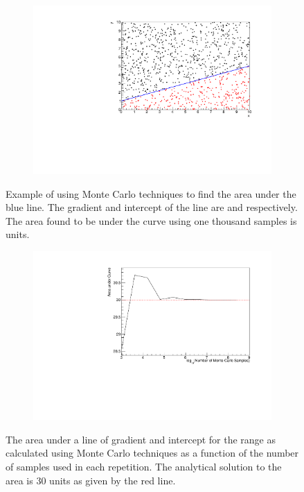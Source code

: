 \begin{figure}[h]
  \begin{subfigure}[t]{0.80\textwidth}
    \includegraphics[width=\textwidth, trim={0mm 0mm 0mm 0mm}, clip,page=1]{Figures/MCMC/MCTechnique.pdf}
  \end{subfigure}
  \caption{Example of using Monte Carlo techniques to find the area under the blue line. The gradient and intercept of the line are  and  respectively. The area found to be under the curve using one thousand samples is  units.}
  \label{fig:MCMC_MCTechnique}
\end{figure}

\begin{figure}[h]
  \begin{subfigure}[t]{0.80\textwidth}
    \includegraphics[width=\textwidth, trim={0mm 0mm 0mm 0mm}, clip,page=1]{Figures/MCMC/MCTechnique_NThrowsStudy.pdf}
  \end{subfigure}
  \caption{The area under a line of gradient  and intercept  for the range  as calculated using Monte Carlo techniques as a function of the number of samples used in each repetition. The analytical solution to the area is 30 units as given by the red line.}
  \label{fig:MCMC_MCTechniqueNThrowsStudy}
\end{figure}

